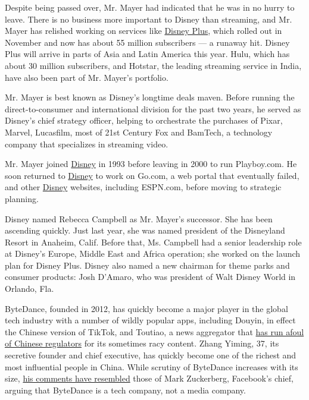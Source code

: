 Despite being passed over, Mr. Mayer had indicated that he was in no
hurry to leave. There is no business more important to Disney than
streaming, and Mr. Mayer has relished working on services like
\href{https://www.nytimes3xbfgragh.onion/2019/04/11/business/media/disney-plus-streaming.html?searchResultPosition=8}{Disney
Plus}, which rolled out in November and now has about 55 million
subscribers --- a runaway hit. Disney Plus will arrive in parts of Asia
and Latin America this year. Hulu, which has about 30 million
subscribers, and Hotstar, the leading streaming service in India, have
also been part of Mr. Mayer's portfolio.

Mr. Mayer is best known as Disney's longtime deals maven. Before running
the direct-to-consumer and international division for the past two
years, he served as Disney's chief strategy officer, helping to
orchestrate the purchases of Pixar, Marvel, Lucasfilm, most of 21st
Century Fox and BamTech, a technology company that specializes in
streaming video.

Mr. Mayer joined \href{javascript:void(0);}{Disney} in 1993 before
leaving in 2000 to run Playboy.com. He soon returned to
\href{javascript:void(0);}{Disney} to work on Go.com, a web portal that
eventually failed, and other \href{javascript:void(0);}{Disney}
websites, including ESPN.com, before moving to strategic planning.

Disney named Rebecca Campbell as Mr. Mayer's successor. She has been
ascending quickly. Just last year, she was named president of the
Disneyland Resort in Anaheim, Calif. Before that, Ms. Campbell had a
senior leadership role at Disney's Europe, Middle East and Africa
operation; she worked on the launch plan for Disney Plus. Disney also
named a new chairman for theme parks and consumer products: Josh
D'Amaro, who was president of Walt Disney World in Orlando, Fla.

ByteDance, founded in 2012, has quickly become a major player in the
global tech industry with a number of wildly popular apps, including
Douyin, in effect the Chinese version of TikTok, and Toutiao, a news
aggregator that
\href{https://www.nytimes3xbfgragh.onion/2018/01/02/business/china-toutiao-censorship.html}{has
run afoul of Chinese regulators} for its sometimes racy content. Zhang
Yiming, 37, its secretive founder and chief executive, has quickly
become one of the richest and most influential people in China. While
scrutiny of ByteDance increases with its size,
\href{https://www.nytimes3xbfgragh.onion/2019/11/05/business/tiktok-china-bytedance.html}{his
comments have resembled} those of Mark Zuckerberg, Facebook's chief,
arguing that ByteDance is a tech company, not a media company.

